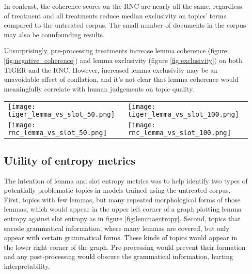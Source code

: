 \documentclass[11pt,a4paper]{article}
\begin{document}
In contrast, the coherence scores on the RNC are nearly all the same, regardless of treatment and all treatments reduce median exclusivity on topics' terms compared to the untreated corpus. The small number of documents in the corpus may also be counfounding results.

Unsurprisingly, pre-processing treatments increase lemma coherence (figure \ref{fig:negative_coherence}) and lemma exclusivity (figure \ref{fig:exclusivity}) on both TIGER and the RNC. However, increased lemma exclusivity  may be an unavoidable affect of conflation, and it's not clear that lemma coherence would meaningfully correlate with human judgements on topic quality.

\begin{figure*}[t]
    \label{fig:entropymetrics}
    \begin{tabular}{ll}
        \texttt{[image: tiger\_lemma\_vs\_slot\_50.png]} & \texttt{[image: tiger\_lemma\_vs\_slot\_100.png]} \\
        \texttt{[image: rnc\_lemma\_vs\_slot\_50.png]} &
        \texttt{[image: rnc\_lemma\_vs\_slot\_100.png]}
    \end{tabular}
\end{figure*}

\subsection{Utility of entropy metrics}
The intention of lemma and slot entropy metrics was to help identify two types of potentially problematic topics in models trained using the untreated corpus. First, topics with few lemmas, but many repeated morphological forms of those lemmas, which would appear in the upper left corner of a graph plotting lemma entropy against slot entropy as in figure \ref{fig:lemmaentropy}. Second, topics that encode grammatical information, where many lemmas are covered, but only appear with certain grammatical forms. These kinds of topics would appear in the lower right corner of the graph. Pre-processing would prevent their formation and any post-processing would obscure the grammatical information, hurting interpretability.
\end{document}
